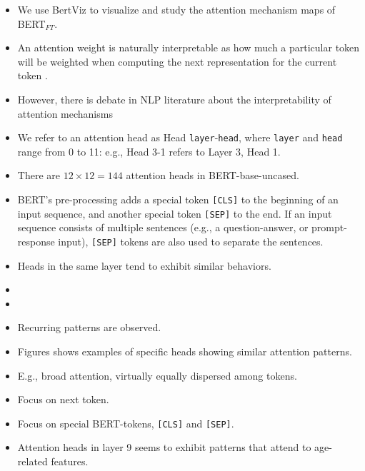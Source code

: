 \begin{itemize}
    \item We use BertViz \citep{vig-2019-multiscale} to visualize and study the attention mechanism maps of BERT$_{FT}$.
    \item An attention weight is naturally interpretable as how much a particular token will be weighted when computing the next representation for the current token \citep{clark-etal-2019-bert}.
    \item However, there is debate in NLP literature about the interpretability of attention mechanisms 
    \item We refer to an attention head as Head \texttt{layer}-\texttt{head}, where \texttt{layer} and \texttt{head} range from 0 to 11: e.g., Head 3-1 refers to Layer 3, Head 1.
    \item There are $12 \times 12 = 144$ attention heads in BERT-base-uncased.
    \item BERT's pre-processing adds a special token \texttt{[CLS]} to the beginning of an input sequence, and another special token \texttt{[SEP]} to the end. If an input sequence consists of multiple sentences (e.g., a question-answer, or prompt-response input), \texttt{[SEP]} tokens are also used to separate the sentences.
    \item Heads in the same layer tend to exhibit similar behaviors.
    \item {}
    \item {}
    \item Recurring patterns are observed.
    \item Figures shows examples of specific heads showing similar attention patterns.
    \item E.g., broad attention, virtually equally dispersed among tokens.
    \item Focus on next token.
    \item Focus on special BERT-tokens, \texttt{[CLS]} and \texttt{[SEP]}.
    \item Attention heads in layer 9 seems to exhibit patterns that attend to age-related features.

\end{itemize}
